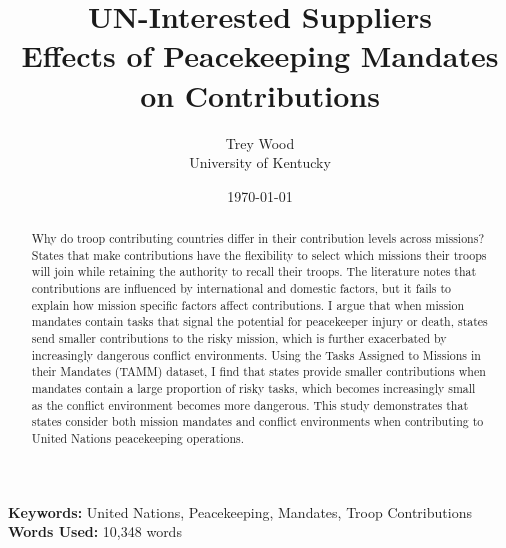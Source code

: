 \documentclass[12pt]{article}
\title{UN-Interested Suppliers \\
\large Effects of Peacekeeping Mandates on Contributions}
\author{Trey Wood \\
University of Kentucky}
\date{\today}
\begin{document}
\begin{titlingpage}
\maketitle
\begin{abstract}
\begin{singlespace}
Why do troop contributing countries differ in their contribution levels across missions? States that make contributions have the flexibility to select which missions their troops will join while retaining the authority to recall their troops. The literature notes that contributions are influenced by international and domestic factors, but it fails to explain how mission specific factors affect contributions. I argue that when mission mandates contain tasks that signal the potential for peacekeeper injury or death, states send smaller contributions to the risky mission, which is further exacerbated by increasingly dangerous conflict environments. Using the Tasks Assigned to Missions in their Mandates (TAMM) dataset, I find that states provide smaller contributions when mandates contain a large proportion of risky tasks, which becomes increasingly small as the conflict environment becomes more dangerous. This study demonstrates that states consider both mission mandates and conflict environments when contributing to United Nations peacekeeping operations.
\end{singlespace}
\end{abstract}
\begin{center}
\textbf{Keywords:} United Nations, Peacekeeping, Mandates, Troop Contributions \\
\textbf{Words Used:} 10,348 words
\end{center}
\end{titlingpage}

\newpage

\end{document}
